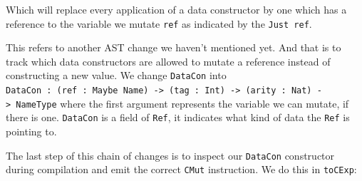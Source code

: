 \documentclass[
]{article}
\newenvironment{Shaded}{}{}
\newcommand{\CommentTok}[1]{\textcolor[rgb]{0.38,0.63,0.69}{\textit{#1}}}
\newcommand{\DataTypeTok}[1]{\textcolor[rgb]{0.56,0.13,0.00}{#1}}
\newcommand{\FunctionTok}[1]{\textcolor[rgb]{0.02,0.16,0.49}{#1}}
\newcommand{\KeywordTok}[1]{\textcolor[rgb]{0.00,0.44,0.13}{\textbf{#1}}}
\newcommand{\NormalTok}[1]{#1}
\newcommand{\OperatorTok}[1]{\textcolor[rgb]{0.40,0.40,0.40}{#1}}
\newcommand{\OtherTok}[1]{\textcolor[rgb]{0.00,0.44,0.13}{#1}}
\begin{document}
\begin{Shaded}
\end{Shaded}

Which will replace every application of a data constructor by one which
has a reference to the variable we mutate \texttt{ref} as indicated by
the \texttt{Just\ ref}.

This refers to another AST change we haven't mentioned yet. And that is
to track which data constructors are allowed to mutate a reference
instead of constructing a new value. We change \texttt{DataCon} into
\texttt{DataCon\ :\ (ref\ :\ Maybe\ Name)\ -\textgreater{}\ (tag\ :\ Int)\ -\textgreater{}\ (arity\ :\ Nat)\ -\textgreater{}\ NameType}
where the first argument represents the variable we can mutate, if there
is one. \texttt{DataCon} is a field of \texttt{Ref}, it indicates what
kind of data the \texttt{Ref} is pointing to.

The last step of this chain of changes is to inspect our
\texttt{DataCon} constructor during compilation and emit the correct
\texttt{CMut} instruction. We do this in \texttt{toCExp}:
\end{document}
